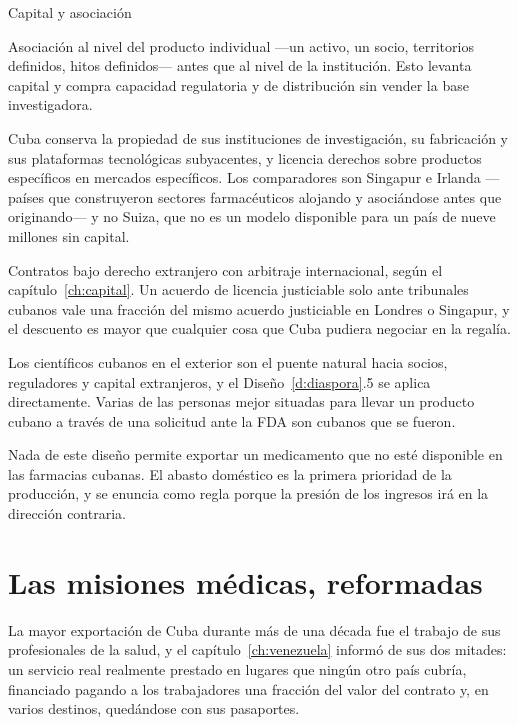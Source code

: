 \begin{design}{Capital y asociación}
\label{d:biopartner}
\begin{rules}
 Asociación al nivel del producto individual
---un activo, un socio, territorios definidos, hitos definidos--- antes que al nivel de la
institución. Esto levanta capital y compra capacidad regulatoria y de distribución sin vender
la base investigadora.

 Cuba conserva la propiedad de sus
instituciones de investigación, su fabricación y sus plataformas tecnológicas subyacentes, y
licencia derechos sobre productos específicos en mercados específicos. Los comparadores son
Singapur e Irlanda ---países que construyeron sectores farmacéuticos alojando y asociándose
antes que originando--- y no Suiza, que no es un modelo disponible para un país de nueve
millones sin capital.

 Contratos bajo derecho extranjero con arbitraje internacional,
según el capítulo~\ref{ch:capital}. Un acuerdo de licencia justiciable solo ante tribunales
cubanos vale una fracción del mismo acuerdo justiciable en Londres o Singapur, y el descuento
es mayor que cualquier cosa que Cuba pudiera negociar en la regalía.

 Los científicos cubanos en el exterior son el puente
natural hacia socios, reguladores y capital extranjeros, y el Diseño~\ref{d:diaspora}.5 se
aplica directamente. Varias de las personas mejor situadas para llevar un producto cubano a
través de una solicitud ante la FDA son cubanos que se fueron.

 Nada de este diseño permite exportar un medicamento que no
esté disponible en las farmacias cubanas. El abasto doméstico es la primera prioridad de la
producción, y se enuncia como regla porque la presión de los ingresos irá en la dirección
contraria.
\end{rules}
\end{design}

\section{Las misiones médicas, reformadas}

La mayor exportación de Cuba durante más de una década fue el trabajo de sus profesionales de
la salud, y el capítulo~\ref{ch:venezuela} informó de sus dos mitades: un servicio real
realmente prestado en lugares que ningún otro país cubría, financiado pagando a los
trabajadores una fracción del valor del contrato y, en varios destinos, quedándose con sus
pasaportes.

